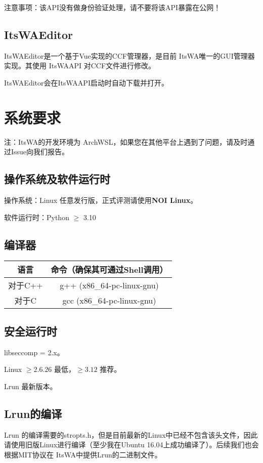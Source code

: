 \documentclass[UTF8]{ctexart}
\newcommand{\itswa}{ItsWA}
\newcommand{\ited}{\itswa \space Editor}
\begin{document}
            注意事项：该API没有做身份验证处理，请不要将该API暴露在公网！

        \subsection{\ited}
            \ited 是一个基于Vue实现的CCF管理器，是目前 \itswa 唯一的GUI管理器实现。其使用 \itswa API 对CCF文件进行修改。

            \ited 会在\itswa API启动时自动下载并打开。
    
    \section{系统要求}
        注：\itswa 的开发环境为 ArchWSL，如果您在其他平台上遇到了问题，请及时通过Issue向我们报告。

        \subsection{操作系统及软件运行时}
            操作系统：Linux 任意发行版，正式评测请使用\textbf{NOI Linux}。

            软件运行时：Python $\geq$ 3.10

        \subsection{编译器}
            \begin{tabular}{|c|c|}
                \hline
                \textbf{语言} & \textbf{命令（确保其可通过Shell调用）} \\
                \hline
                对于C++ & g++ (x86\_64-pc-linux-gnu) \\
                \hline
                对于C & gcc \space \space (x86\_64-pc-linux-gnu) \\
                \hline
            \end{tabular}

        \subsection{安全运行时}
            libseccomp = 2.x。

            Linux $\ge 2.6.26$ 最低，$\ge 3.12$ 推荐。

            Lrun 最新版本。

        \subsection{Lrun的编译}
            Lrun 的编译需要的stropts.h，但是目前最新的Linux中已经不包含该头文件，因此请使用旧版Linux进行编译（至少我在Ubuntu 16.04上成功编译了）。后续我们也会根据MIT协议在 \itswa 中提供Lrun的二进制文件。
        
\end{document}
